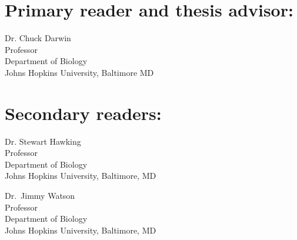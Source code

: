 
\Blindtext[3]


\begin{singlespace}

\section*{Primary reader and thesis advisor:}

Dr. Chuck Darwin \\
Professor\\
Department of Biology\\
Johns Hopkins University, Baltimore MD 



\section*{Secondary readers: }

Dr. Stewart Hawking\\
Professor\\
Department of Biology \\
Johns Hopkins University, Baltimore, MD 

\vspace{0.1in}

Dr.~Jimmy Watson \\
Professor\\
Department of Biology \\
Johns Hopkins University, Baltimore, MD 


\end{singlespace}